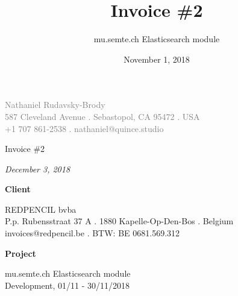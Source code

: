 \documentclass[11pt]{article}
\author{mu.semte.ch Elasticsearch module}
\date{November 1, 2018}
\title{Invoice \#2}
\begin{document}
 \thispagestyle{empty}
\centering

{\small\textcolor{gray}{
Nathaniel Rudavsky-Brody \\
587 Cleveland Avenue . Sebastopol, CA 95472 . USA\\
+1 707 861-2538  . nathaniel@quince.studio\\
}}

\vspace{4em}

{\Huge Invoice \#2	}

\vspace{1em}

{\textit{December 3, 2018}}

\vspace{1em}

{\Large\textbf{Client}}

REDPENCIL bvba\\
P.p. Rubensstraat 37 A . 1880 Kapelle-Op-Den-Bos . Belgium\\
invoices@redpencil.be . BTW: BE 0681.569.312

\vspace{1em}

{\Large\textbf{Project}}

 mu.semte.ch Elasticsearch module\\
 Development, 01/11 - 30/11/2018

\vspace{1em}
\end{document}
